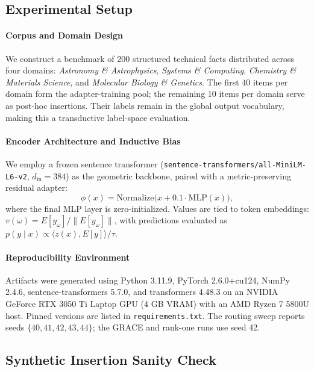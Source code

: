 \documentclass[preprint,12pt]{elsarticle}
\begin{document}
\subsection{Experimental Setup}

\paragraph{Corpus and Domain Design}
We construct a benchmark of 200 structured technical facts distributed across four domains: \emph{Astronomy \& Astrophysics}, \emph{Systems \& Computing}, \emph{Chemistry \& Materials Science}, and \emph{Molecular Biology \& Genetics}. The first 40 items per domain form the adapter-training pool; the remaining 10 items per domain serve as post-hoc insertions. Their labels remain in the global output vocabulary, making this a transductive label-space evaluation.

\paragraph{Encoder Architecture and Inductive Bias}
We employ a frozen sentence transformer (\texttt{sentence-transformers/all-MiniLM-L6-v2}, $d_{\mathrm{in}} = 384$) as the geometric backbone, paired with a metric-preserving residual adapter:
\[
  \phi(x) = \mathrm{Normalize}\big( x + 0.1 \cdot \mathrm{MLP}(x) \big),
\]
where the final MLP layer is zero-initialized. Values are tied to token embeddings: $v(\omega) = E[y_\omega] / \|E[y_\omega]\|$, with predictions evaluated as $p(y \mid x) \propto \langle z(x), E[y] \rangle / \tau$.

\paragraph{Reproducibility Environment}
Artifacts were generated using Python 3.11.9, PyTorch 2.6.0+cu124, NumPy 2.4.6, sentence-transformers 5.7.0, and transformers 4.48.3 on an NVIDIA GeForce RTX 3050 Ti Laptop GPU (4 GB VRAM) with an AMD Ryzen 7 5800U host. Pinned versions are listed in \texttt{requirements.txt}. The routing sweep reports seeds $\{40,41,42,43,44\}$; the GRACE and rank-one runs use seed 42.

\subsection{Synthetic Insertion Sanity Check}
\label{sec:synthetic_insertion}
\end{document}
